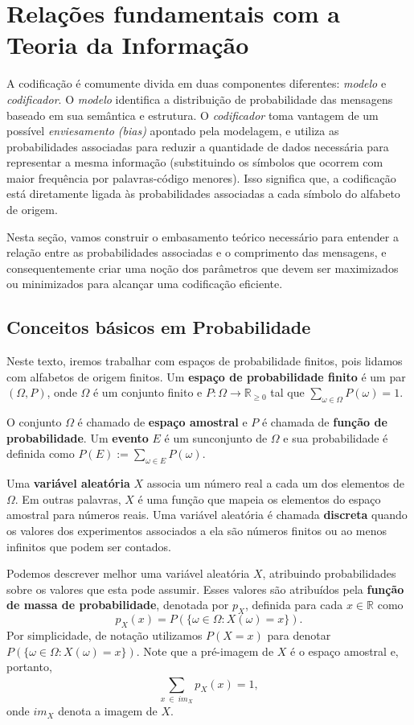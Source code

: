 \section{Relações fundamentais com a Teoria da Informação}
A codificação é comumente divida em duas componentes diferentes: \emph{modelo} e \emph{codificador}. 
O \emph{modelo} identifica a distribuição de probabilidade das mensagens baseado em sua semântica e estrutura. 
O \emph{codificador} toma vantagem de um possível \emph{enviesamento (bias)} apontado pela modelagem, e utiliza as probabilidades associadas para reduzir a quantidade de dados necessária para representar a mesma informação (substituindo os símbolos que ocorrem com maior frequência por palavras-código menores).
Isso significa que, a codificação está diretamente ligada às probabilidades associadas a cada símbolo do alfabeto de origem.

Nesta seção, vamos construir o embasamento teórico necessário para entender a relação entre as probabilidades associadas e o comprimento das mensagens, e consequentemente criar uma noção dos parâmetros que devem ser maximizados ou minimizados para alcançar uma codificação eficiente.

\subsection{Conceitos básicos em Probabilidade}
Neste texto, iremos trabalhar com espaços de probabilidade finitos,
pois lidamos com alfabetos de origem finitos. Um \textbf{espaço de
  probabilidade finito} é um par $(\Omega, P)$, onde $\Omega$ é um
conjunto finito e $P\colon \Omega \to \mathbb{R}_{\geq 0}$ tal que
$\sum_{\omega \in \Omega} P(\omega) = 1$.

O conjunto $\Omega$ é chamado de \textbf{espaço amostral} e $P$ é
chamada de \textbf{função de probabilidade}. Um \textbf{evento} $E$ é
um sunconjunto de $\Omega$ e sua probabilidade é definida como $P(E)
:= \sum_{\omega \in E} P(\omega)$.

Uma \textbf{variável aleatória} $X$ associa um número real a cada
um dos elementos de $\Omega$. Em outras palavras, $X$ é uma
função que mapeia os elementos do espaço amostral para números
reais. Uma variável aleatória é chamada \textbf{discreta} quando os
valores dos experimentos associados a ela são números finitos ou ao
menos infinitos que podem ser contados.

Podemos descrever melhor uma variável aleatória $X$, atribuindo
probabilidades sobre os valores que esta pode assumir. Esses valores
são atribuídos pela \textbf{função de massa de probabilidade},
denotada por $p_X$, definida para cada $x\in\mathbb{R}$ como
\begin{equation} \label{eq:dist_prob_def}
p_X(x) = P(\{\omega\in \Omega: X(\omega) = x\}).
\end{equation}
Por simplicidade, de notação utilizamos $P(X=x)$ para denotar
$P(\{\omega\in \Omega: X(\omega) = x\})$. Note que a pré-imagem de $X$
é o espaço amostral e, portanto,
\begin{equation} \label{eq:dist_prob_sum}
\sum_{x ~\in ~im_X}^{}p_X(x) = 1,
\end{equation}
onde $im_X$ denota a imagem de $X$.


